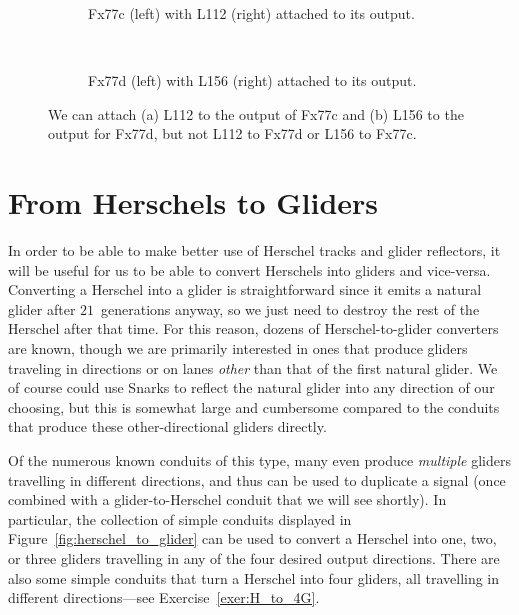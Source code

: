 \begin{figure}[!htb]
	\centering
	\begin{subfigure}{.5\textwidth}
		\centering
		\caption{Fx77c (left) with L112 (right) attached to its output.}
		\label{fig:fx77c_l112}
	\end{subfigure}\ \ \ \ %
	\begin{subfigure}{.47\textwidth}
		\centering
		\caption{Fx77d (left) with L156 (right) attached to its output.}
		\label{fig:fx77d_l156}
	\end{subfigure}
	\caption{We can attach (a) L112 to the output of Fx77c and (b) L156 to the output for Fx77d, but not L112 to Fx77d or L156 to Fx77c.}\label{fig:fx77_variants_with_l}
\end{figure}


\section{From Herschels to Gliders}\label{sec:herschels_to_gliders}

In order to be able to make better use of Herschel tracks and glider reflectors, it will be useful for us to be able to convert Herschels into gliders and vice-versa. Converting a Herschel into a glider is straightforward since it emits a natural glider after $21$~generations anyway, so we just need to destroy the rest of the Herschel after that time. For this reason, dozens of Herschel-to-glider converters are known, though we are primarily interested in ones that produce gliders traveling in directions or on lanes \emph{other} than that of the first natural glider. We of course could use Snarks to reflect the natural glider into any direction of our choosing, but this is somewhat large and cumbersome compared to the conduits that produce these other-directional gliders directly.

Of the numerous known conduits of this type, many even produce \emph{multiple} gliders travelling in different directions, and thus can be used to duplicate a signal (once combined with a glider-to-Herschel conduit that we will see shortly). In particular, the collection of simple conduits displayed in Figure~\ref{fig:herschel_to_glider} can be used to convert a Herschel into one, two, or three gliders travelling in any of the four desired output directions. There are also some simple conduits that turn a Herschel into four gliders, all travelling in different directions---see Exercise~\ref{exer:H_to_4G}.

